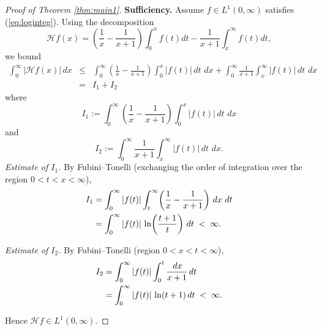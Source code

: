 \documentclass[12pt,a4paper]{amsart}
\theoremstyle{definition}
\newcommand{\Lp}[1]{L^{#1}(0,\infty)}
\newcommand{\dt}{\,dt}
\newcommand{\dx}{\,dx}
\begin{document}
\begin{proof}[Proof of Theorem \ref{thm:main1}]
    \textbf{Sufficiency.}
Assume $f\in\Lp{1}$ satisfies (\ref{eq:loginteg}).
Using the decomposition
\begin{equation}\label{eq:Hsplit}
    \mathcal{H}f(x)=\left(\frac{1}{x}-\frac{1}{x+1}\right)\int_0^x f(t)dt-\frac{1}{x+1}\int_x^\infty f(t)dt,
\end{equation}
we bound
\begin{eqnarray*}\label{eq:Hest}
  \int_0^\infty |\mathcal{H}f(x)|\dx
  &\le&
  \int_0^\infty \left(\frac{1}{x}-\frac{1}{x+1}\right)\int_0^x|f(t)|\dt\,\dx
  +
  \int_0^\infty \frac{1}{x+1}\int_x^\infty|f(t)|\dt\,\dx\\ &=& I_1+I_2
\end{eqnarray*}
where $$I_1:=\int_0^\infty \left(\frac{1}{x}-\frac{1}{x+1}\right)\int_0^x|f(t)|\dt\,\dx$$
and $$I_2:=\int_0^\infty \frac{1}{x+1}\int_x^\infty|f(t)|\dt\,\dx.$$
\medskip\noindent
\textit{Estimate of $I_1$.}
By Fubini--Tonelli (exchanging the order of integration over the region
$0<t<x<\infty$),
\begin{align}
  I_1
  &= \int_0^\infty |f(t)|\int_t^\infty
     \!\left(\frac{1}{x}-\frac{1}{x+1}\right)\dx\,\dt \notag\\
  &= \int_0^\infty |f(t)|\,\ln\!\left(\frac{t+1}{t}\right)\dt
  \;<\;\infty. 
\end{align}

\medskip\noindent
\textit{Estimate of $I_2$.}
By Fubini--Tonelli (region $0<x<t<\infty$),
\begin{align}
  I_2
  &= \int_0^\infty |f(t)|\int_0^t \frac{\dx}{x+1}\dt \notag\\
  &= \int_0^\infty |f(t)|\,\ln(t+1)\dt
  \;<\;\infty.
\end{align}

Hence $\mathcal{H}f\in\Lp{1}$.


\end{proof}
\end{document}
